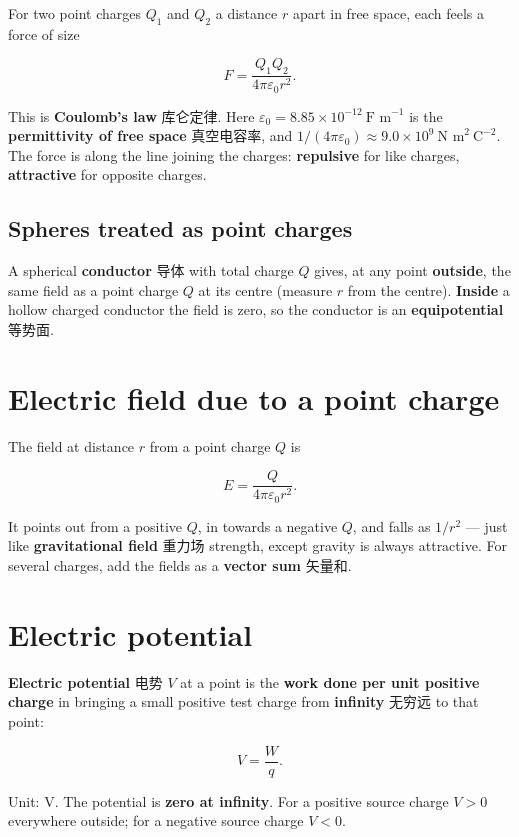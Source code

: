\documentclass[11pt]{article}
\begin{document}
For two point charges $Q_{1}$ and $Q_{2}$ a distance $r$ apart in free space, each feels a force of size

\[
F = \frac{Q_{1} Q_{2}}{4\pi\varepsilon_{0} r^{2}}.
\]

This is \textbf{Coulomb's law} 库仑定律. Here $\varepsilon_{0} = 8.85 \times 10^{-12}\ \text{F m}^{-1}$ is the \textbf{permittivity of free space} 真空电容率, and $1/(4\pi\varepsilon_{0}) \approx 9.0 \times 10^{9}\ \text{N m}^{2}\ \text{C}^{-2}$. The force is along the line joining the charges: \textbf{repulsive} for like charges, \textbf{attractive} for opposite charges.

\subsection*{Spheres treated as point charges}

A spherical \textbf{conductor} 导体 with total charge $Q$ gives, at any point \textbf{outside}, the same field as a point charge $Q$ at its centre (measure $r$ from the centre). \textbf{Inside} a hollow charged conductor the field is zero, so the conductor is an \textbf{equipotential} 等势面.

\section*{Electric field due to a point charge}

The field at distance $r$ from a point charge $Q$ is

\[
E = \frac{Q}{4\pi\varepsilon_{0} r^{2}}.
\]

It points out from a positive $Q$, in towards a negative $Q$, and falls as $1/r^{2}$ — just like \textbf{gravitational field} 重力场 strength, except gravity is always attractive. For several charges, add the fields as a \textbf{vector sum} 矢量和.

\section*{Electric potential}

\textbf{Electric potential} 电势 $V$ at a point is the \textbf{work done per unit positive charge} in bringing a small positive test charge from \textbf{infinity} 无穷远 to that point:

\[
V = \frac{W}{q}.
\]

Unit: $\text{V}$. The potential is \textbf{zero at infinity}. For a positive source charge $V > 0$ everywhere outside; for a negative source charge $V < 0$.
\end{document}
